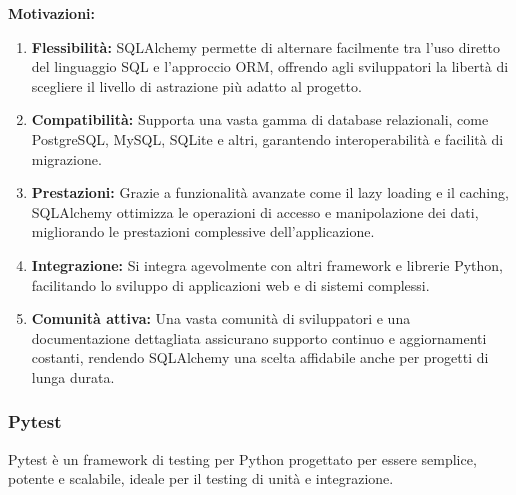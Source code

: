 \textbf{Motivazioni:}
\begin{enumerate}
    \item \textbf{Flessibilità:} SQLAlchemy permette di alternare facilmente tra l'uso diretto del linguaggio SQL e l'approccio ORM, offrendo agli sviluppatori la libertà di scegliere il livello di astrazione più adatto al progetto.
    \item \textbf{Compatibilità:} Supporta una vasta gamma di database relazionali, come PostgreSQL, MySQL, SQLite e altri, garantendo interoperabilità e facilità di migrazione.
    \item \textbf{Prestazioni:} Grazie a funzionalità avanzate come il lazy loading e il caching, SQLAlchemy ottimizza le operazioni di accesso e manipolazione dei dati, migliorando le prestazioni complessive dell'applicazione.
    \item \textbf{Integrazione:} Si integra agevolmente con altri framework e librerie Python, facilitando lo sviluppo di applicazioni web e di sistemi complessi.
    \item \textbf{Comunità attiva:} Una vasta comunità di sviluppatori e una documentazione dettagliata assicurano supporto continuo e aggiornamenti costanti, rendendo SQLAlchemy una scelta affidabile anche per progetti di lunga durata.
\end{enumerate}

\subsubsection{Pytest}
\label{subsubsec:pytest}
Pytest è un framework di testing per Python progettato per essere semplice, potente e scalabile, ideale per il testing di unità e integrazione.\\

